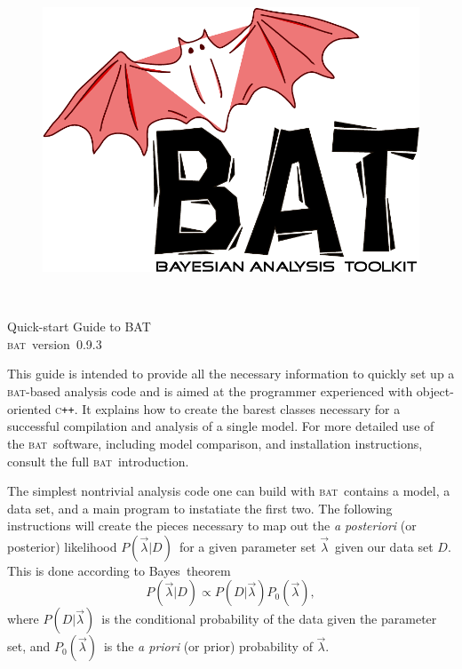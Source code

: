 \documentclass[a4paper,11pt]{article}
\newcommand{\acronym}[1]{\textsc{#1}}
\newcommand{\BAT}{\acronym{bat}}
\newcommand{\C}{\textsc{c}}
\newcommand{\CPP}{\C\texttt{++}}
\newcommand{\BProb}[2]{\ensuremath{P(#1|#2)}}
\newcommand{\BPars}{\ensuremath{\vec{\lambda}}}
\newcommand{\BData}{\ensuremath{D}}
\newcommand{\BPrior}{\ensuremath{P_0(\BPars)}}
\newcommand{\BPosterior}{\BProb{\BPars}{\BData}}
\newcommand{\BConditional}{\BProb{\BData}{\BPars}}
\newcommand{\versionno}{0.9.3}
\newcommand{\version}{version~\versionno}
\begin{document}

\begin{figure}[t]
\includegraphics[scale=0.25]{bat}
\end{figure}
\quad\\
\vspace{2\baselineskip}

\begin{center}
  {\Large Quick-start Guide to BAT}\\
  \vspace{1\baselineskip}
  {\large \BAT\ \version}
\end{center}

\vspace{4\baselineskip}

This guide is intended to provide all the necessary information to
quickly set up a \BAT-based analysis code and is aimed at the
programmer experienced with object-oriented \CPP. It explains how to
create the barest classes necessary for a successful compilation and
analysis of a single model. For more detailed use of the \BAT\
software, including model comparison, and installation instructions,
consult the full \BAT\ introduction.

The simplest nontrivial analysis code one can build with \BAT\
contains a model, a data set, and a main program to instatiate the
first two. The following instructions will create the pieces necessary
to map out the \emph{a posteriori} (or posterior) likelihood
\BPosterior\ for a given parameter set \BPars\ given our data set
\BData.  This is done according to Bayes\ theorem
\begin{displaymath}
  \BPosterior \propto \BConditional\BPrior,
\end{displaymath}
where \BConditional\ is the conditional probability of the data given
the parameter set, and \BPrior\ is the \emph{a priori} (or prior)
probability of \BPars.
\end{document}
